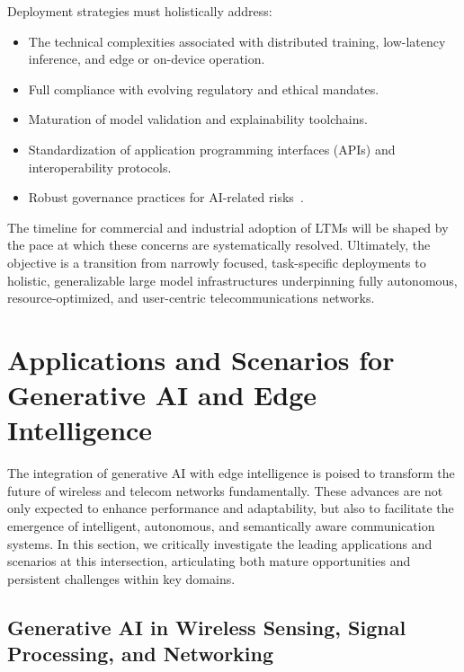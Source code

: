 \documentclass[sigconf]{acmart}
\begin{document}
Deployment strategies must holistically address:

\begin{itemize}
    \item The technical complexities associated with distributed training, low-latency inference, and edge or on-device operation.
    \item Full compliance with evolving regulatory and ethical mandates.
    \item Maturation of model validation and explainability toolchains.
    \item Standardization of application programming interfaces (APIs) and interoperability protocols.
    \item Robust governance practices for AI-related risks~\cite{ref46,ref49}.
\end{itemize}

The timeline for commercial and industrial adoption of LTMs will be shaped by the pace at which these concerns are systematically resolved. Ultimately, the objective is a transition from narrowly focused, task-specific deployments to holistic, generalizable large model infrastructures underpinning fully autonomous, resource-optimized, and user-centric telecommunications networks.

\section{Applications and Scenarios for Generative AI and Edge Intelligence}

The integration of generative AI with edge intelligence is poised to transform the future of wireless and telecom networks fundamentally. These advances are not only expected to enhance performance and adaptability, but also to facilitate the emergence of intelligent, autonomous, and semantically aware communication systems. In this section, we critically investigate the leading applications and scenarios at this intersection, articulating both mature opportunities and persistent challenges within key domains.

\subsection{Generative AI in Wireless Sensing, Signal Processing, and Networking}
\end{document}
